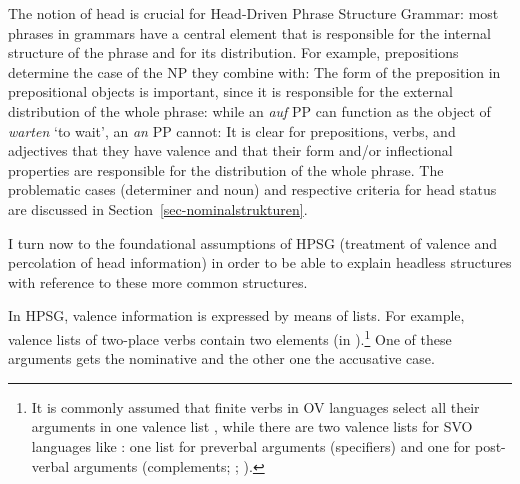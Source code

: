 \documentclass[output=paper
  ,nobabel
  ,draftmode
  ,uniformtopskip %
  ,colorlinks, citecolor=brown
]{langscibook}
\begin{document}
The notion of head is crucial for Head-Driven Phrase Structure Grammar: most phrases in grammars
have a central element that is responsible for the internal structure of the phrase and for its
distribution. For example, prepositions determine the case of the NP they combine with:
\eal
{}
\zl
The form of the preposition in prepositional objects is important, since it is responsible for the
external distribution of the whole phrase: while an \emph{auf} PP can function as the object of
\emph{warten} `to wait', an \emph{an} PP cannot:
\eal
{}
\zl
It is clear for prepositions, verbs, and adjectives that they have valence and that their
form and/or inflectional properties are responsible for the distribution of the whole phrase. The problematic
cases (determiner and noun) and respective criteria for head status are discussed in Section~\ref{sec-nominalstrukturen}.

I turn now to the foundational assumptions of HPSG (treatment of valence and percolation of
head information) in order to be able to explain headless structures with reference to these more
common structures.

In HPSG, valence information is expressed by means of lists. For example, valence lists of two-place
verbs contain two elements (in ).\footnote{
  It is commonly assumed that finite verbs in OV languages select all their arguments in one valence
  list \parencites[--296]{Pollard90a-Eng}[Section~3.1.1]{Kiss95a}[]{Mueller2002b}, while there are two valence lists for SVO languages like : one list for preverbal
  arguments (specifiers) and one for post-verbal arguments (complements;
  \citealp*[Section~4.3]{SWB2003a}; \citealp[Section~4.3]{MuellerGermanic}).
}
One of these arguments gets the nominative and the other one the accusative case. 
\end{document}
